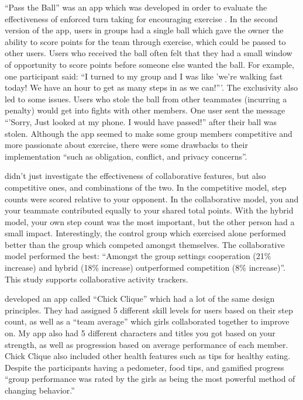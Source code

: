 \documentclass{l4proj}
\begin{document}
``Pass the Ball'' was an app which was developed in order to evaluate the effectiveness of enforced turn taking for encouraging exercise \citep{Pass_the_ball}. In the second version of the app, users in groups had a single ball which gave the owner the ability to score points for the team through exercise, which could be passed to other users. Users who received the ball often felt that they had a small window of opportunity to score points before someone else wanted the ball. For example, one participant said: ``I turned to my group and I was like 'we’re walking fast today! We have an hour to get as many steps in as we can!'''. The exclusivity also led to some issues. Users who stole the ball from other teammates (incurring a penalty) would get into fights with other members. One user sent the message ``'Sorry, Just looked at my phone. I would have passed!'' after their ball was stolen. Although the app seemed to make some group members competitive and more passionate about exercise, there were some drawbacks to their implementation ``such as obligation, conflict, and privacy concerns''.

\citet{HealthyTogether} didn't just investigate the effectiveness of collaborative features, but also competitive ones, and combinations of the two. In the competitive model, step counts were scored relative to your opponent. In the collaborative model, you and your teammate contributed equally to your shared total points.  With the hybrid model, your own step count was the most important, but the other person had a small impact. Interestingly, the control group which exercised alone performed better than the group which competed amongst themselves. The collaborative model performed the best: ``Amongst the group settings cooperation (21\% increase) and hybrid (18\% increase) outperformed competition (8\% increase)''. This study supports collaborative activity trackers.

\citet{ChickClique} developed an app called ``Chick Clique'' which had a lot of the same design principles. They had assigned 5 different skill levels for users based on their step count, as well as a ``team average'' which girls collaborated together to improve on. My app also had 5 different characters and titles you got based on your strength, as well as progression based on average performance of each member. Chick Clique also included other health features such as tips for healthy eating. Despite the participants having a pedometer, food tips, and gamified progress ``group performance was rated by the girls as being the most powerful method of changing behavior.'' 
\end{document}
